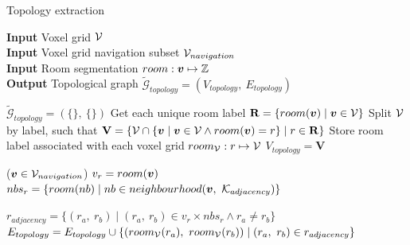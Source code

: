 \begin{algorithm}
    \caption{Topology extraction}
    \hspace*{\algorithmicindent} \textbf{Input} Voxel grid \(\mathcal{V}\) \\
    \hspace*{\algorithmicindent} \textbf{Input} Voxel grid navigation subset \(\mathcal{V}_{navigation}\) \\
    \hspace*{\algorithmicindent} \textbf{Input} Room segmentation \(room: \boldsymbol{v} \mapsto \mathbb{Z}\) \\
    \hspace*{\algorithmicindent} \textbf{Output} Topological graph \(\widetilde{\mathcal{G}}_{topology} = (V_{topology},\ E_{topology})\) \\

    \begin{algorithmic}

    \State $\widetilde{\mathcal{G}}_{topology} = (\{\},\ \{\})$
    \State Get each unique room label \(\mathbf{R} = \{room(\boldsymbol{v}) \mid \boldsymbol{v} \in \mathcal{V}\}\)
    \State Split \(\mathcal{V}\) by label, such that \(\mathbf{V} = \{\mathcal{V} \cap \{\boldsymbol{v} \mid \boldsymbol{v} \in \mathcal{V} \land room(\boldsymbol{v}) = r\} \mid r \in \mathbf{R}\}\)
    \State Store room label associated with each voxel grid \(room_{\mathcal{V}}: r \mapsto \mathcal{V}\)
    \State $V_{topology} = \mathbf{V}$

    \ForEach($\boldsymbol{v} \in \mathcal{V}_{navigation}$)
        \State $v_r = room(\boldsymbol{v})$
        \State $nbs_r = \{room(nb) \mid nb \in neighbourhood(\boldsymbol{v},\ \mathcal{K}_{adjacency})\}$

        \State $r_{adjacency} = \{(r_a,\ r_b) \mid (r_a,\ r_b) \in {v_r} \times {nbs_r} \land r_a \neq r_b\}$
        \State $E_{topology} = E_{topology} \cup \{(room_{\mathcal{V}}(r_a),\ room_{\mathcal{V}}(r_b)) \mid (r_a,\ r_b) \in r_{adjacency}\}$
    \EndFor
    \end{algorithmic}
\end{algorithm}